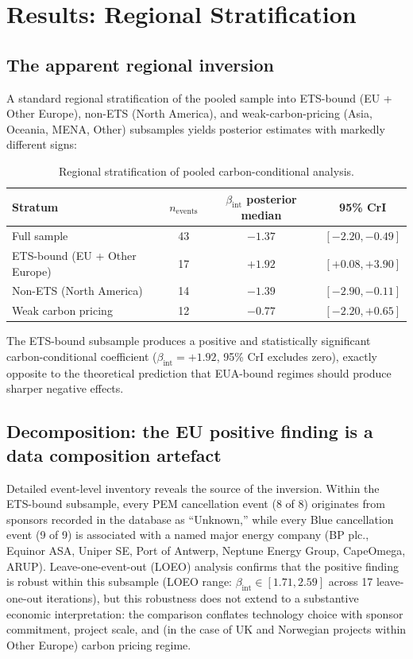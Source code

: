 \documentclass[11pt,a4paper]{article}
\newcommand{\bint}{\beta_{\mathrm{int}}}
\begin{document}
\section{Results: Regional Stratification}
\label{sec:ch7-regional}
\label{sec:ch7-results-stratified}

\subsection{The apparent regional inversion}

A standard regional stratification of the pooled sample into ETS-bound (EU + Other Europe), non-ETS (North America), and weak-carbon-pricing (Asia, Oceania, MENA, Other) subsamples yields posterior estimates with markedly different signs:

\begin{table}[h!]
\centering
\caption{Regional stratification of pooled carbon-conditional analysis.}
\begin{tabular}{lccc}
\toprule
Stratum & $n_{\mathrm{events}}$ & $\bint$ posterior median & 95\% CrI \\
\midrule
Full sample & 43 & $-1.37$ & $[-2.20, -0.49]$ \\
ETS-bound (EU + Other Europe) & 17 & $\mathbf{+1.92}$ & $\mathbf{[+0.08, +3.90]}$ \\
Non-ETS (North America) & 14 & $-1.39$ & $[-2.90, -0.11]$ \\
Weak carbon pricing & 12 & $-0.77$ & $[-2.20, +0.65]$ \\
\bottomrule
\end{tabular}
\label{tab:ch7-regional}
\end{table}

The ETS-bound subsample produces a positive and statistically significant carbon-conditional coefficient ($\bint = +1.92$, 95\% CrI excludes zero), exactly opposite to the theoretical prediction that EUA-bound regimes should produce sharper negative effects.

\subsection{Decomposition: the EU positive finding is a data composition artefact}

Detailed event-level inventory reveals the source of the inversion. Within the ETS-bound subsample, every PEM cancellation event (8 of 8) originates from sponsors recorded in the database as ``Unknown,'' while every Blue cancellation event (9 of 9) is associated with a named major energy company (BP plc., Equinor ASA, Uniper SE, Port of Antwerp, Neptune Energy Group, CapeOmega, ARUP). Leave-one-event-out (LOEO) analysis confirms that the positive finding is robust within this subsample (LOEO range: $\bint \in [1.71, 2.59]$ across 17 leave-one-out iterations), but this robustness does not extend to a substantive economic interpretation: the comparison conflates technology choice with sponsor commitment, project scale, and (in the case of UK and Norwegian projects within Other Europe) carbon pricing regime.
\end{document}
